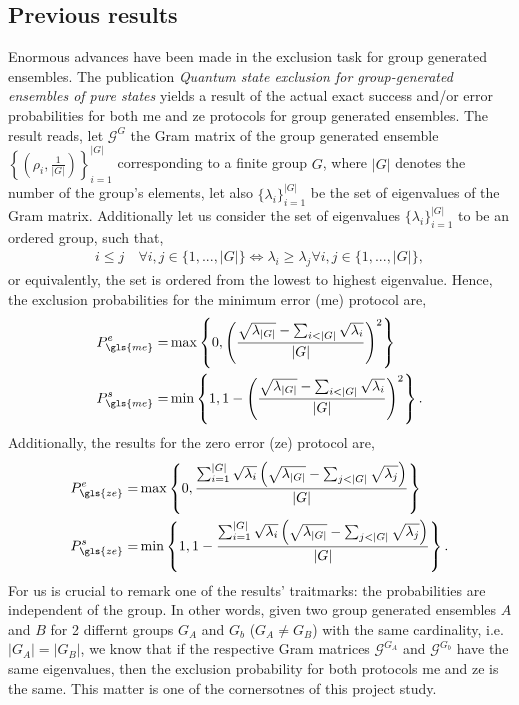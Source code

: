 \documentclass[12pt,letterpaper]{article}
\begin{document}
\begin{multicols}{2}
\subsection{Previous results}\label{sectionPreviousResults}
Enormous advances have been made in the exclusion task for group generated ensembles. The publication \emph{Quantum state exclusion for group-generated ensembles of pure states}\cite{MainPaper} yields a result of the actual exact success and/or error probabilities for both \gls{me} and \gls{ze} protocols for group generated ensembles. The result reads, let $\mathcal{G}^{G}$ the Gram matrix of the group generated ensemble $\left\{\left(\rho_i,\frac{1}{|G|}\right)\right\}_{i=1}^{|G|}$ corresponding to a finite group $G$, where $|G|$ denotes the number of the group's elements, let also $\{\lambda_i\}_{i=1}^{|G|}$ be the set of eigenvalues of the Gram matrix. Additionally let us consider the set of eigenvalues $\{\lambda_i\}_{i=1}^{|G|}$ to be an ordered group, such that,
\begin{align*}
	i\leq j\quad\forall i,j\in\{1,...,|G|\}\Leftrightarrow \lambda_i\geq\lambda_j \forall i,j\in\{1,...,|G|\},
\end{align*}
or equivalently, the set is ordered from the lowest to highest eigenvalue. Hence, the exclusion probabilities for the minimum error (\gls{me}) protocol are,
\begin{align*}
	P_{\gls{me}}^e=&\max\left\{0,\left(\frac{\sqrt{\lambda_{|G|}}-\sum_{i<|G|}\sqrt{\lambda_i}}{|G|}\right)^2\right\}\\
	P_{\gls{me}}^s=&\min\left\{1,1-\left(\frac{\sqrt{\lambda_{|G|}}-\sum_{i<|G|}\sqrt{\lambda_i}}{|G|}\right)^2\right\}.
\end{align*}
Additionally, the results for the zero error (\gls{ze}) protocol are,
\begin{align*}
	P_{\gls{ze}}^e=&\max\left\{0,\frac{\sum_{i=1}^{|G|}\sqrt{\lambda_i}\left(\sqrt{\lambda_{|G|}}-\sum_{j<|G|}\sqrt{\lambda_j}\right)}{|G|}\right\}\\
	P_{\gls{ze}}^s=&\min\left\{1,1-\frac{\sum_{i=1}^{|G|}\sqrt{\lambda_i}\left(\sqrt{\lambda_{|G|}}-\sum_{j<|G|}\sqrt{\lambda_j}\right)}{|G|}\right\}.
\end{align*}
For us is crucial to remark one of the results' traitmarks: the probabilities are independent of the group. In other words, given two group generated ensembles $A$ and $B$ for 2 differnt groups $G_A$ and $G_b$ ($G_A\neq G_B$) with the same cardinality, i.e. $|G_A|=|G_B|$, we know that if the respective Gram matrices $\mathcal{G}^{G_A}$ and $\mathcal{G}^{G_b}$ have the same eigenvalues, then the exclusion probability for both protocols \gls{me} and \gls{ze} is the same. This matter is one of the cornersotnes of this project study.


\end{multicols}
\end{document}

